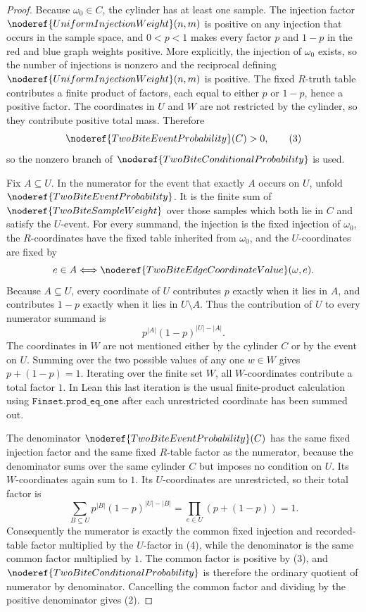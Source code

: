 \begin{proof}
Because \(\omega_0\in C\), the cylinder has at least one sample.  The
injection factor
\(\noderef{UniformInjectionWeight}(n,m)\) is positive on any injection that
occurs in the sample space, and \(0<p<1\) makes every factor \(p\) and
\(1-p\) in the red and blue graph weights positive.  More explicitly, the
injection of \(\omega_0\) exists, so the number of injections is nonzero and
the reciprocal defining
\(\noderef{UniformInjectionWeight}(n,m)\) is positive.  The fixed
\(R\)-truth table contributes a finite product of factors, each equal to
either \(p\) or \(1-p\), hence a positive factor.  The coordinates in \(U\)
and \(W\) are not restricted by the cylinder, so they contribute positive
total mass.  Therefore
\[
\noderef{TwoBiteEventProbability}(C)>0,
\tag{3}
\]
so the nonzero branch of
\(\noderef{TwoBiteConditionalProbability}\) is used.

Fix \(A\subseteq U\).  In the numerator for the event that exactly \(A\)
occurs on \(U\), unfold \(\noderef{TwoBiteEventProbability}\).  It is the
finite sum of \(\noderef{TwoBiteSampleWeight}\) over those samples which both
lie in \(C\) and satisfy the \(U\)-event.  For every summand, the injection
is the fixed injection of \(\omega_0\), the \(R\)-coordinates have the fixed
table inherited from \(\omega_0\), and the \(U\)-coordinates are fixed by
\[
e\in A \Longleftrightarrow
\noderef{TwoBiteEdgeCoordinateValue}(\omega,e).
\]
Because \(A\subseteq U\), every coordinate of \(U\) contributes \(p\) exactly
when it lies in \(A\), and contributes \(1-p\) exactly when it lies in
\(U\setminus A\).  Thus the contribution of \(U\) to every numerator summand is
\[
p^{|A|}(1-p)^{|U|-|A|}. \tag{4}
\]
The coordinates in \(W\) are not mentioned either by the cylinder \(C\) or by
the event on \(U\).  Summing over the two possible values of any one
\(w\in W\) gives \(p+(1-p)=1\).  Iterating over the finite set \(W\), all
\(W\)-coordinates contribute a total factor \(1\).  In Lean this last
iteration is the usual finite-product calculation using
\(\texttt{Finset.prod\_eq\_one}\) after each unrestricted coordinate has
been summed out.

The denominator \(\noderef{TwoBiteEventProbability}(C)\) has the same fixed
injection factor and the same fixed \(R\)-table factor as the numerator,
because the denominator sums over the same cylinder \(C\) but imposes no
condition on \(U\).  Its \(W\)-coordinates again sum to \(1\).  Its
\(U\)-coordinates are unrestricted, so their total
factor is
\[
\sum_{B\subseteq U}p^{|B|}(1-p)^{|U|-|B|}
=\prod_{e\in U}(p+(1-p))=1. \tag{5}
\]
Consequently the numerator is exactly the common fixed injection and
recorded-table factor multiplied by the \(U\)-factor in (4), while the
denominator is the same common factor multiplied by \(1\).  The common factor
is positive by (3), and
\(\noderef{TwoBiteConditionalProbability}\) is therefore the ordinary quotient
of numerator by denominator.  Cancelling the common factor and dividing by
the positive denominator gives (2).
\end{proof}
